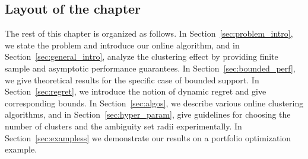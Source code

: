 



\subsection{Layout of the chapter}
The rest of this chapter is organized as follows.
In Section~\ref{sec:problem_intro}, we state the problem and introduce our online algorithm, and in Section~\ref{sec:general_intro}, analyze the clustering effect by providing finite sample and asymptotic performance guarantees.
In Section~\ref{sec:bounded_perf}, we give theoretical results for the specific case of bounded support. 
In Section~\ref{sec:regret}, we introduce the notion of dynamic regret and give corresponding bounds.
In Section~\ref{sec:algos}, we describe various online clustering algorithms, and
in Section~\ref{sec:hyper_param}, give guidelines for choosing the number of clusters and the ambiguity set radii experimentally. In Section~\ref{sec:exampless} we demonstrate our results on a portfolio optimization example. 

